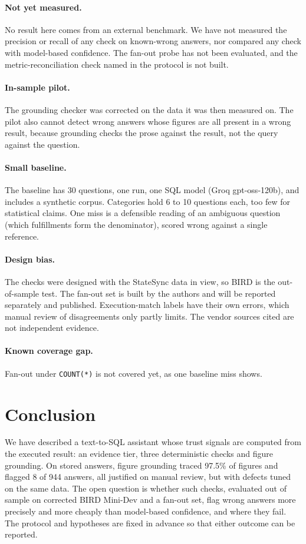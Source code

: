 \documentclass[10pt,twocolumn]{article}
\begin{document}
\paragraph{Not yet measured.} No result here comes from an external benchmark. We have not measured the precision or recall of any check on known-wrong answers, nor compared any check with model-based confidence. The fan-out probe has not been evaluated, and the metric-reconciliation check named in the protocol is not built.
\paragraph{In-sample pilot.} The grounding checker was corrected on the data it was then measured on. The pilot also cannot detect wrong answers whose figures are all present in a wrong result, because grounding checks the prose against the result, not the query against the question.
\paragraph{Small baseline.} The baseline has 30 questions, one run, one SQL model (Groq gpt-oss-120b), and includes a synthetic corpus. Categories hold 6 to 10 questions each, too few for statistical claims. One miss is a defensible reading of an ambiguous question (which fulfillments form the denominator), scored wrong against a single reference.
\paragraph{Design bias.} The checks were designed with the StateSync data in view, so BIRD is the out-of-sample test. The fan-out set is built by the authors and will be reported separately and published. Execution-match labels have their own errors, which manual review of disagreements only partly limits. The vendor sources cited are not independent evidence.
\paragraph{Known coverage gap.} Fan-out under \texttt{COUNT(*)} is not covered yet, as one baseline miss shows.

\section{Conclusion}
We have described a text-to-SQL assistant whose trust signals are computed from the executed result: an evidence tier, three deterministic checks and figure grounding. On stored answers, figure grounding traced 97.5\% of figures and flagged 8 of 944 answers, all justified on manual review, but with defects tuned on the same data. The open question is whether such checks, evaluated out of sample on corrected BIRD Mini-Dev and a fan-out set, flag wrong answers more precisely and more cheaply than model-based confidence, and where they fail. The protocol and hypotheses are fixed in advance so that either outcome can be reported.
\end{document}
